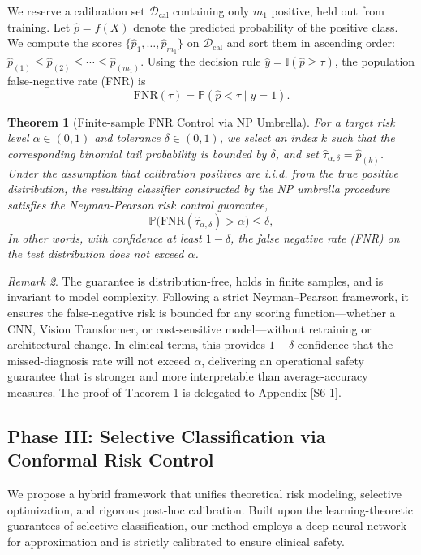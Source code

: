 \documentclass[sigconf,review,anonymous]{acmart}
\newtheorem{theorem}{Theorem}[section]
\theoremstyle{remark}
\newtheorem{remark}[theorem]{Remark}
\begin{document}
We reserve a calibration set \(\mathcal{D}_{\mathrm{cal}}\) containing only \(m_{1}\) positive, held out from training. 
Let \(\hat{p} = f(X)\) denote the predicted probability of the positive class. We compute the scores \(\{\hat{p}_1,\dots,\hat{p}_{m_{1}}\}\) on \(\mathcal{D}_{\mathrm{cal}}\) and sort them in ascending order: \(\hat{p}_{(1)} \le \hat{p}_{(2)} \le \cdots \le \hat{p}_{(m_{1})}\).  
Using the decision rule \(\hat{y} = \mathbb{I}(\hat{p} \ge \tau)\), the population false‑negative rate (FNR) is  
\[
\mathrm{FNR}(\tau) = \mathbb{P}(\hat{p} < \tau \mid y=1).
\]

\begin{theorem}[Finite-sample FNR Control via NP Umbrella]\label{Th1}
For a target risk level $\alpha\in(0,1)$ and tolerance $\delta\in(0,1)$, we select an index $k$ such that the corresponding binomial tail probability is bounded by $\delta$, and set $\hat{\tau}_{\alpha,\delta} = \hat{p}_{(k)}$. Under the assumption that calibration positives are i.i.d. from the true positive distribution, the resulting classifier constructed by the NP umbrella procedure satisfies the Neyman-Pearson risk control guarantee,
\[
\mathbb{P}\bigl(\mathrm{FNR}(\hat{\tau}_{\alpha,\delta}) > \alpha\bigr)
\leq \delta,
\]
In other words, with confidence at least $1-\delta$, the false negative rate (FNR) on the test distribution does not exceed $\alpha$.
\end{theorem}

\begin{remark}
The guarantee is distribution-free, holds in finite samples, and is invariant to model complexity. Following a strict Neyman--Pearson framework, it ensures the false-negative risk is bounded for any scoring function---whether a CNN, Vision Transformer, or cost-sensitive model---without retraining or architectural change. In clinical terms, this provides $1-\delta$ confidence that the missed-diagnosis rate will not exceed $\alpha$, delivering an operational safety guarantee that is stronger and more interpretable than average-accuracy measures. The proof of Theorem \ref{Th1} is delegated to Appendix \ref{S6-1}.
\end{remark}


\subsection{Phase III: Selective Classification via Conformal Risk Control}\label{sec:phase3_method}

We propose a hybrid framework that unifies theoretical risk modeling, selective optimization, and rigorous post-hoc calibration. Built upon the learning-theoretic guarantees of selective classification, our method employs a deep neural network for approximation and is strictly calibrated to ensure clinical safety.
\end{document}
